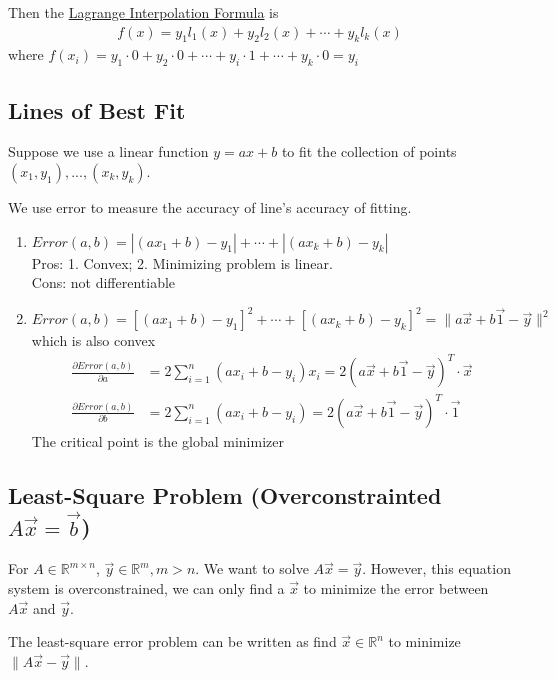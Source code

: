 \documentclass[11pt,a4paper]{article}
\begin{document}
Then the \underline{Lagrange Interpolation Formula} is
\begin{equation}
    \begin{aligned}
        f(x)=y_1l_1(x)+y_2l_2(x)+\cdots+y_kl_k(x)
    \end{aligned}
    \nonumber
\end{equation}
where $f(x_i)=y_1\cdot 0+y_2\cdot 0+\cdots +y_i\cdot 1+\cdots+y_k\cdot 0=y_i$

\subsection{Lines of Best Fit}
Suppose we use a linear function $y=ax+b$ to fit the collection of points $(x_1,y_1),...,(x_k,y_k)$.

We use error to measure the accuracy of line's accuracy of fitting.
\begin{enumerate}
    \item $Error(a,b)=|(ax_1+b)-y_1|+\cdots+|(ax_k+b)-y_k|$\\
    Pros: 1. Convex; 2. Minimizing problem is linear.\\
    Cons: not differentiable
    \item $Error(a,b)=[(ax_1+b)-y_1]^2+\cdots+[(ax_k+b)-y_k]^2=\|a\vec{x}+b\vec{1}-\vec{y}\|^2$
    which is also convex
    \begin{equation}
        \begin{aligned}
            \frac{\partial Error(a,b)}{\partial a}&=2\sum_{i=1}^n(ax_i+b-y_i)x_i=2(a\vec{x}+b\vec{1}-\vec{y})^T\cdot\vec{x}\\
            \frac{\partial Error(a,b)}{\partial b}&=2\sum_{i=1}^n(ax_i+b-y_i)=2(a\vec{x}+b\vec{1}-\vec{y})^T\cdot\vec{1}
        \end{aligned}
        \nonumber
    \end{equation}
    The critical point is the global minimizer
\end{enumerate}

\subsection{Least-Square Problem (Overconstrainted $A \vec{x}= \vec{b}$)}
For $A\in \mathbb{R}^{m\times n}$, $\vec{y}\in \mathbb{R}^m, m>n$. We want to solve $A\vec{x}=\vec{y}$. However, this equation system is overconstrained, we can only find a $\vec{x}$ to minimize the error between $A\vec{x}$ and $\vec{y}$.

The least-square error problem can be written as find $\vec{x}\in \mathbb{R}^n$ to minimize $\|A\vec{x}-\vec{y}\|$.
\end{document}

